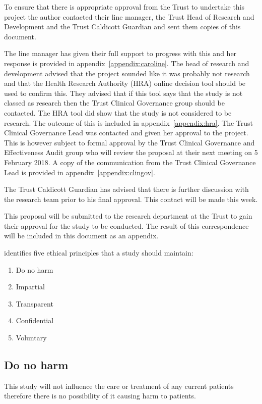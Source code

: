 \documentclass
[
	12pt,
	a4paper,
	oneside,
]{article}
\begin{document}
To ensure that there is appropriate approval from the Trust to undertake this project
the author contacted their line manager, the Trust Head of Research and Development and
the Trust Caldicott Guardian and sent them copies of this document. 

The line manager has given their full support to progress with this and her response 
is provided in appendix~\ref{appendix:caroline}. The head of research and development
advised that the project sounded like it was probably not research and that 
the Health Research Authority (HRA) online decision tool should be used to confirm this.
They advised that if this tool says that the study is not classed as research then
the Trust Clinical Governance group should be contacted. The HRA tool did show
that the study is not considered to be research. The outcome of this is included
in appendix~\ref{appendix:hra}. The Trust Clinical Governance Lead was contacted
and given her approval to the project. This is however subject to formal approval
by the Trust Clinical Governance and Effectiveness Audit group who will review 
the proposal at their next meeting on 5 February 2018. A copy of the communication
from the Trust Clinical Governance Lead is provided in appendix~\ref{appendix:clingov}.

The Trust Caldicott Guardian has advised that there is further discussion with 
the research team prior to his final approval. This contact will be made this week.

This proposal will be submitted to the research department at the Trust to gain 
their approval for the study to be conducted. The result of this correspondence 
will be included in this document as an appendix.

\textcite{biggam:15} identifies five ethical principles that a study should maintain:
\begin{enumerate}
\item Do no harm
\item Impartial
\item Transparent
\item Confidential
\item Voluntary
\end{enumerate}

\subsection{Do no harm}
This study will not influence the care or treatment of any current patients therefore
there is no possibility of it causing harm to patients.
\end{document}
